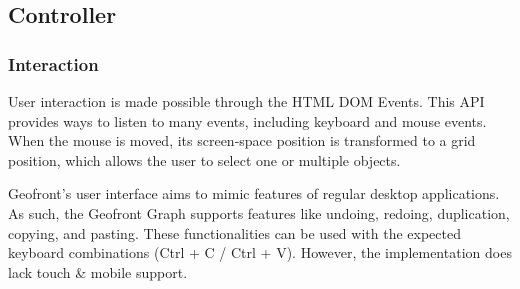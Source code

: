 \subsection{Controller}





\subsubsection{Interaction}
User interaction is made possible through the HTML DOM Events. 
This API provides ways to listen to many events, including keyboard and mouse events. 
When the mouse is moved, its screen-space position is transformed to a grid position, which allows the user to select one or multiple objects. 

Geofront's user interface aims to mimic features of regular desktop applications. 
As such, the Geofront Graph supports features like undoing, redoing, duplication, copying, and pasting. 
These functionalities can be used with the expected keyboard combinations (Ctrl + C / Ctrl + V).
However, the implementation does lack touch \& mobile support.

